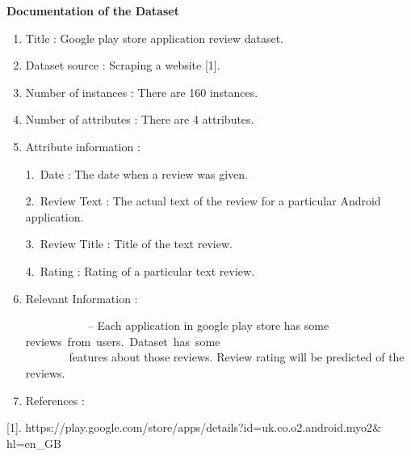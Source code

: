 \documentclass[12pt]{article}
\begin{document}
\begin{Center}
\textbf{Documentation of the Dataset}
\end{Center}\par

\begin{enumerate}
	\item Title : Google play store application review dataset.\par

	\item Dataset source : Scraping a website [1].\par

	\item Number of instances : There are 160 instances.\par

	\item Number of attributes : There are 4 attributes.\par

	\item Attribute information :\par

\begin{justify}
1.\  Date : The date when a review was given.
\end{justify}\par

\begin{justify}
2.\  Review Text : The actual text of the review for a particular Android application.
\end{justify}\par

\begin{justify}
3.\  Review Title : Title of the text review.
\end{justify}\par

\begin{justify}
4.\  Rating : Rating of a particular text review.
\end{justify}\par

\setlength{\parskip}{0.0pt}
	\item Relevant Information :\par

\ \ \ \ \ \ \ \ \ \ \  -- Each application in google play store has some reviews\ from\ users.\ Dataset\ has\ some\ \ \ \ \ \ \ \ \ \ \ \ \ \ \ \ \ \ \ \ \ \ \ \ \ \ \ \ \ \ \ \ \ \ \ \ \ \ \ \ \        \tabto{0.64in} features about those reviews. Review rating will be predicted of the reviews.\par


\vspace{\baselineskip}	\item References :
\end{enumerate}\par

[1]. https://play.google.com/store/apps/details?id=uk.co.o2.android.myo2$\&$ hl=en\_GB\par


\vspace{\baselineskip}
\setlength{\parskip}{9.96pt}

\vspace{\baselineskip}

\vspace{\baselineskip}
\end{document}
